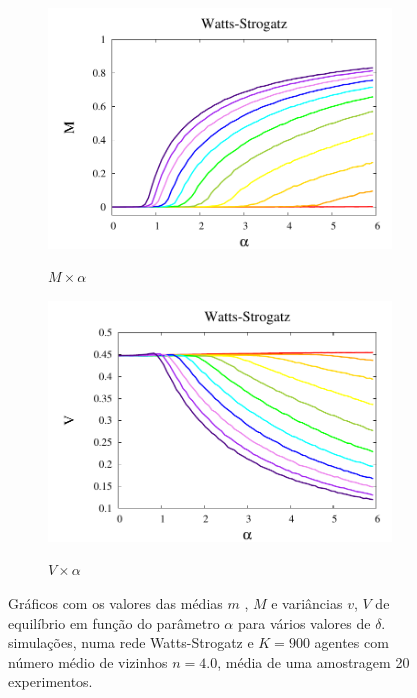 \begin{figure}
\begin{subfigure}[]{0.65\textwidth}
        \includegraphics[width = \textwidth]{Figures/DeltaXBeta_MMag}
        \label{fig:fM}
        \caption{$M\times\alpha$}
    \end{subfigure}
    \begin{subfigure}[]{0.65\textwidth}
        \includegraphics[width = \textwidth]{Figures/DeltaXBeta_VVar}
        \label{fig:fV}
        \caption{$V\times\alpha$}
    \end{subfigure}
    \newline
    \caption{ 
        Gráficos com os valores das médias $m$ , $M$ e variâncias  $v$, $V$
        de equilíbrio em função do parâmetro $\alpha$ para vários valores
        de $\delta$. simulações, numa rede Watts-Strogatz e $K=900$ agentes
        com número médio de vizinhos $n=4.0$, média de uma amostragem 20
        experimentos.
    }
    \label{fig:ov}
\end{figure}

